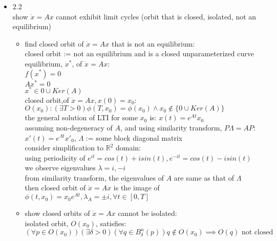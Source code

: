\documentclass[12pt,letter]{article}
\newcommand{\R}{\mathbb{R}}
\begin{document}


\begin{itemize}
  
\item 2.2\\
  show $\dot{x}=Ax$ cannot exhibit limit cycles (orbit that is closed, isolated, not an equilibrium)
  \begin{itemize}
  \item find closed orbit of $\dot{x}=Ax$ that is not an equilibrium:\\
  closed orbit := not an equilibrium and is a closed unparameterized curve\\
  equilibrium, $x^*$, of $\dot{x}=Ax$:\\
  $f(x^*)=0$\\
  $Ax^*=0$\\
  $x^* \in 0 \cup Ker(A)$\\
  
  closed orbit,of $\dot{x}=Ax, x(0)=x_0$:\\
  $O(x_0): (\exists T > 0) \phi(T,x_0) = \phi(x_0) \wedge x_0 \notin \{0 \cup Ker(A)\}$\\
  the general solution of LTI for some $x_0$ is: $x(t)=e^{At}x_0$\\
  assuming non-degeneracy of $A$, and using similarity transform, $P\Lambda=AP$: \\
  $x'(t)=e^{\Lambda t} x'_0$, $\Lambda$ := some block diagonal matrix\\
  consider simplification to $\R^2$ domain:\\
  using periodicity of $e^{it}=cos(t)+isin(t), e^{-it}=cos(t)-isin(t)$\\
  we observe eigenvalues $\lambda = i, -i$\\
  from similarity transform, the eigenvalues of $A$ are same as that of $\Lambda$\\
  then closed orbit of $\dot{x}=Ax$ is the image of $\phi(t,x_0)=x_0e^{At}, \lambda_A = \pm i, \forall t \in [0,T]$\\

  \item show closed orbits of $\dot{x}=Ax$ cannot be isolated:\\
  isolated orbit, $O(x_0)$, satisfies:\\
  $(\forall p \in O(x_0))(\exists \delta > 0)(\forall q \in B_{\delta}^n(p)) q \notin O(x_0) \implies O(q) \text{ not closed}$\\


\end{itemize}
\end{itemize}
\end{document}
